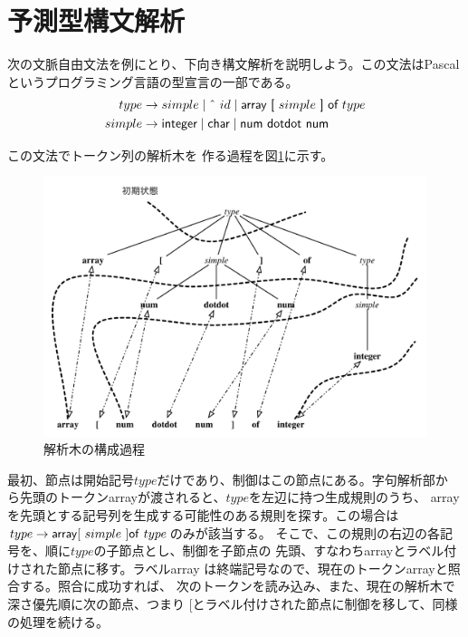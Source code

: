 \section{予測型構文解析}

次の文脈自由文法を例にとり、下向き構文解析を説明しよう。この文法はPascal
というプログラミング言語の型宣言の一部である。
\begin{equation}
\begin{split}
 type & \rightarrow simple \mid \text{\^{}}\ id
 \mid \text{{\sffamily array}}\ \text{{\sffamily [}}\ simple\ \text{{\sffamily ]}}\ \text{{\sffamily of}}\ type \\
 simple & \rightarrow \text{{\sffamily integer}} \mid \text{{\sffamily
 char}} \mid \text{{\sffamily num}}\ \text{{\sffamily dotdot}}\ \text{{\sffamily num}}
\end{split}\label{151415_10Apr06}
\end{equation}

この文法でトークン列の解析木を
作る過程を図\ref{154017_30Mar06}に示す。

\begin{figure}
 \begin{center}
  \includegraphics[width=12cm]{figure/making_parse_tree.pdf}
 \end{center}
 \caption{解析木の構成過程}
 \label{154017_30Mar06}
\end{figure}

最初、節点は開始記号$type$だけであり、制御はこの節点にある。字句解析部か
ら先頭のトークン{\sf array}が渡されると、$type$を左辺に持つ生成規則のうち、
{\sf array}を先頭とする記号列を生成する可能性のある規則を探す。この場合は
$type \rightarrow {\sf array [}\ simple\ {\sf ] of}\ type$のみが該当する。
そこで、この規則の右辺の各記号を、順に$type$の子節点とし、制御を子節点の
先頭、すなわち{\sf array}とラベル付けされた節点に移す。ラベル{\sf array}
は終端記号なので、現在のトークン{\sf array}と照合する。照合に成功すれば、
次のトークンを読み込み、また、現在の解析木で深さ優先順に次の節点、つまり
{\sf [}とラベル付けされた節点に制御を移して、同様の処理を続ける。

